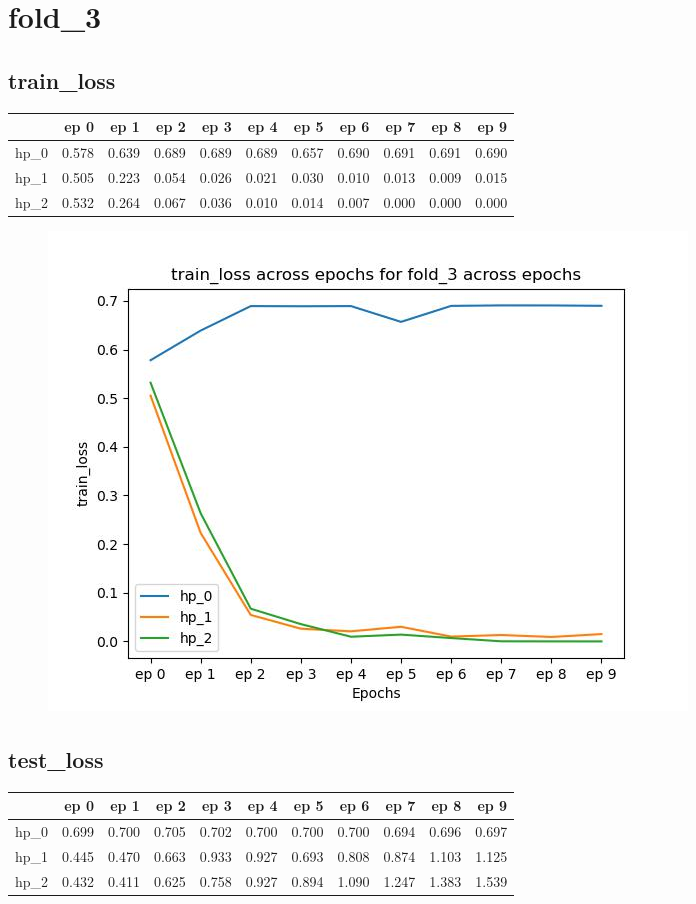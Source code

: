\documentclass{article}
\begin{document}
\section{fold\_3}
\subsection{train\_loss}
\begin{tabular}{lrrrrrrrrrr}
\toprule
{} &   ep 0 &   ep 1 &   ep 2 &   ep 3 &   ep 4 &   ep 5 &   ep 6 &   ep 7 &   ep 8 &   ep 9 \\
\midrule
hp\_0 &  0.578 &  0.639 &  0.689 &  0.689 &  0.689 &  0.657 &  0.690 &  0.691 &  0.691 &  0.690 \\
hp\_1 &  0.505 &  0.223 &  0.054 &  0.026 &  0.021 &  0.030 &  0.010 &  0.013 &  0.009 &  0.015 \\
hp\_2 &  0.532 &  0.264 &  0.067 &  0.036 &  0.010 &  0.014 &  0.007 &  0.000 &  0.000 &  0.000 \\
\bottomrule
\end{tabular}

\begin{figure}[H]
\includegraphics[scale = 0.75]{fold_3/train_loss}
\end{figure}
\subsection{test\_loss}
\begin{tabular}{lrrrrrrrrrr}
\toprule
{} &   ep 0 &   ep 1 &   ep 2 &   ep 3 &   ep 4 &   ep 5 &   ep 6 &   ep 7 &   ep 8 &   ep 9 \\
\midrule
hp\_0 &  0.699 &  0.700 &  0.705 &  0.702 &  0.700 &  0.700 &  0.700 &  0.694 &  0.696 &  0.697 \\
hp\_1 &  0.445 &  0.470 &  0.663 &  0.933 &  0.927 &  0.693 &  0.808 &  0.874 &  1.103 &  1.125 \\
hp\_2 &  0.432 &  0.411 &  0.625 &  0.758 &  0.927 &  0.894 &  1.090 &  1.247 &  1.383 &  1.539 \\
\bottomrule
\end{tabular}
\end{document}
